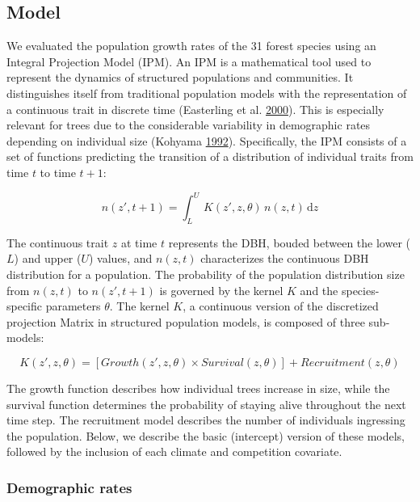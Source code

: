 \documentclass[12pt]{article}
\begin{document}
\hypertarget{model}{%
\subsection{Model}\label{model}}

We evaluated the population growth rates of the 31 forest species using
an Integral Projection Model (IPM). An IPM is a mathematical tool used
to represent the dynamics of structured populations and communities. It
distinguishes itself from traditional population models with the
representation of a continuous trait in discrete time (Easterling et al.
\protect\hyperlink{ref-Easterling2000}{2000}). This is especially
relevant for trees due to the considerable variability in demographic
rates depending on individual size (Kohyama
\protect\hyperlink{ref-kohyama1992}{1992}). Specifically, the IPM
consists of a set of functions predicting the transition of a
distribution of individual traits from time \(t\) to time \(t+1\):

\begin{equation}
n(z', t + 1) = \int_{L}^{U} \, K(z', z, \theta)\, n(z, t)\, \mathrm{d}z
\label{eq:ipm}\end{equation}

The continuous trait \(z\) at time \(t\) represents the DBH, bouded
between the lower (\(L\)) and upper (\(U\)) values, and \(n(z, t)\)
characterizes the continuous DBH distribution for a population. The
probability of the population distribution size from \(n(z, t)\) to
\(n(z', t+1)\) is governed by the kernel \(K\) and the species-specific
parameters \(\theta\). The kernel \(K\), a continuous version of the
discretized projection Matrix in structured population models, is
composed of three sub-models:

\begin{equation}
K(z', z, \theta) = [Growth(z', z, \theta) \times Survival(z, \theta)] + Recruitment(z, \theta)
\label{eq:kernel}\end{equation}

The growth function describes how individual trees increase in size,
while the survival function determines the probability of staying alive
throughout the next time step. The recruitment model describes the
number of individuals ingressing the population. Below, we describe the
basic (intercept) version of these models, followed by the inclusion of
each climate and competition covariate.

\hypertarget{demographic-rates}{%
\subsubsection{Demographic rates}\label{demographic-rates}}
\end{document}
